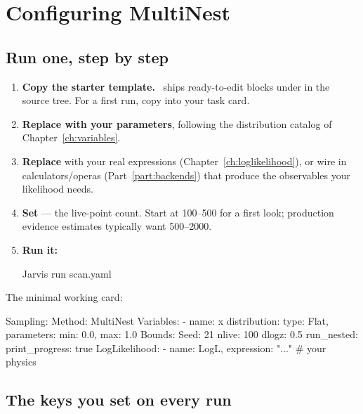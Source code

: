 \section{Configuring MultiNest}
\label{sec:multinest-yaml}

\subsection{Run one, step by step}
\label{sec:nested-run}

\begin{enumerate}
  \item \textbf{Copy the starter template.} \Jtwo\ ships ready-to-edit
         blocks under  in the
         source tree. For a first run, copy
         into your task card.
  \item \textbf{Replace  with your parameters}, following the
        distribution catalog of Chapter~\ref{ch:variables}.
  \item \textbf{Replace } with your real expressions
        (Chapter~\ref{ch:loglikelihood}), or wire in calculators/operas
        (Part~\ref{part:backends}) that produce the observables your likelihood needs.
  \item \textbf{Set } --- the live-point count. Start at
        100--500 for a first look; production evidence estimates typically want
        500--2000.
  \item \textbf{Run it:}
\begin{terminal}
\begin{jcmd}
Jarvis run scan.yaml
\end{jcmd}
\end{terminal}
\end{enumerate}

The minimal working card:

\begin{yamlwin}
Sampling:
  Method: MultiNest
  Variables:
    - name: x
      distribution: {type: Flat, parameters: {min: 0.0, max: 1.0}}
  Bounds:
    Seed: 21
    nlive: 100
    dlogz: 0.5
    run_nested:
      print_progress: true
  LogLikelihood:
    - {name: LogL, expression: "..."}   # your physics
\end{yamlwin}

\subsection{The keys you set on every run}
\label{sec:nested-bounds-meta}

